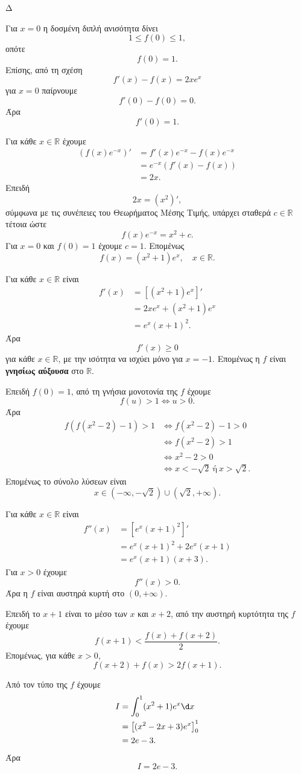 \begin{thema}{Δ}
\begin{erwthma}
\item Για $x=0$ η δοσμένη διπλή ανισότητα δίνει
\[
1\leq f(0)\leq1,
\]
οπότε
\[
{f(0)=1}.
\]
Επίσης, από τη σχέση
\[
f'(x)-f(x)=2xe^x
\]
για $x=0$ παίρνουμε
\[
f'(0)-f(0)=0.
\]
Άρα
\[
{f'(0)=1}.
\]

Για κάθε $x\in\mathbb{R}$ έχουμε
\begin{align*}
\left(f(x)e^{-x}\right)'
&=f'(x)e^{-x}-f(x)e^{-x}\\
&=e^{-x}\left(f'(x)-f(x)\right)\\
&=2x.
\end{align*}
Επειδή
\[
2x=(x^2)',
\]
σύμφωνα με τις συνέπειες του Θεωρήματος Μέσης Τιμής, υπάρχει σταθερά $c\in\mathbb{R}$ τέτοια ώστε
\[
f(x)e^{-x}=x^2+c.
\]
Για $x=0$ και $f(0)=1$ έχουμε $c=1$. Επομένως
\[
{f(x)=(x^2+1)e^x},
\quad x\in\mathbb{R}.
\]

\item Για κάθε $x\in\mathbb{R}$ είναι
\begin{align*}
f'(x)
&=\left[(x^2+1)e^x\right]'\\
&=2xe^x+(x^2+1)e^x\\
&=e^x(x+1)^2.
\end{align*}
Άρα
\[
f'(x)\geq0
\]
για κάθε $x\in\mathbb{R}$, με την ισότητα να ισχύει μόνο για $x=-1$. Επομένως η $f$ είναι \textbf{γνησίως αύξουσα} στο $\mathbb{R}$.

Επειδή $f(0)=1$, από τη γνήσια μονοτονία της $f$ έχουμε
\[
f(u)>1\Leftrightarrow u>0.
\]
Άρα
\begin{align*}
f\left(f(x^2-2)-1\right)>1
&\Leftrightarrow f(x^2-2)-1>0\\
&\Leftrightarrow f(x^2-2)>1\\
&\Leftrightarrow x^2-2>0\\
&\Leftrightarrow x<-\sqrt{2}\ \text{ή}\ x>\sqrt{2}.
\end{align*}
Επομένως το σύνολο λύσεων είναι
\[
{x\in(-\infty,-\sqrt{2})\cup(\sqrt{2},+\infty)}.
\]

\item Για κάθε $x\in\mathbb{R}$ είναι
\begin{align*}
f''(x)
&=\left[e^x(x+1)^2\right]'\\
&=e^x(x+1)^2+2e^x(x+1)\\
&=e^x(x+1)(x+3).
\end{align*}
Για $x>0$ έχουμε
\[
f''(x)>0.
\]
Άρα η $f$ είναι αυστηρά κυρτή στο $(0,+\infty)$.

Επειδή το $x+1$ είναι το μέσο των $x$ και $x+2$, από την αυστηρή κυρτότητα της $f$ έχουμε
\[
f(x+1)<\frac{f(x)+f(x+2)}{2}.
\]
Επομένως, για κάθε $x>0$,
\[
{f(x+2)+f(x)>2f(x+1)}.
\]

\item Από τον τύπο της $f$ έχουμε
\begin{align*}
I
&=\int_0^1(x^2+1)e^x\d x\\
&=\left[(x^2-2x+3)e^x\right]_0^1\\
&=2e-3.
\end{align*}
Άρα
\[
{I=2e-3}.
\]
\end{erwthma}
\end{thema}
